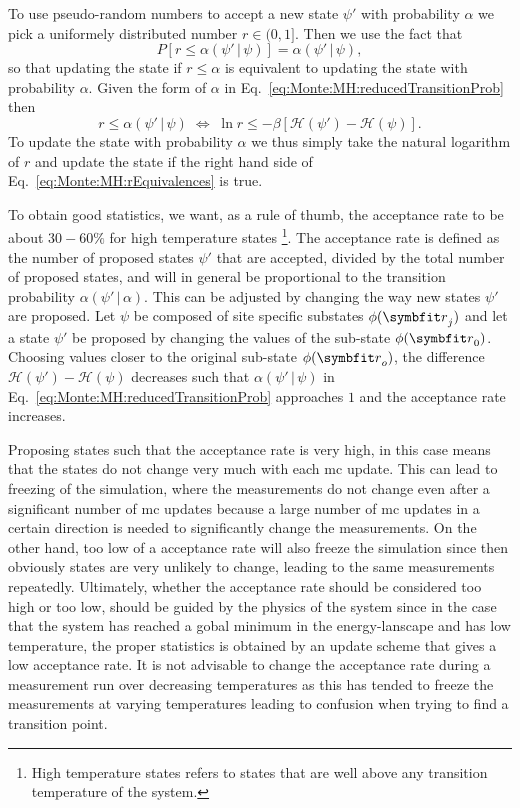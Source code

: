 To use pseudo-random numbers to accept a new state $\psi'$ with probability $\alpha$ we pick a uniformely distributed number $r\in(0,1]$. Then
we use the fact that
\begin{equation}
    \label{eq:Monte:MH:rProbability}
    P[r \leq \alpha(\psi'\,|\,\psi)] = \alpha(\psi'\,|\,\psi),
\end{equation}
so that updating the state if $r\leq\alpha$ is equivalent to updating the state with probability $\alpha$. Given the form of $\alpha$ in
Eq.~\eqref{eq:Monte:MH:reducedTransitionProb} then
\begin{equation}
    \label{eq:Monte:MH:rEquivalences}
    r \leq \alpha(\psi'\,|\,\psi)\;\Leftrightarrow\;\ln r \leq -\beta[\mathcal{H}(\psi')-\mathcal{H}(\psi)].
\end{equation}
To update the state with probability $\alpha$ we thus simply take the natural logarithm of $r$ and update the state if the right hand
side of Eq.~\eqref{eq:Monte:MH:rEquivalences} is true.

To obtain good statistics, we want, as a rule of thumb, the acceptance rate to be about $30-60\%$ for high temperature states%
\footnote{High temperature states refers to states that are well above any transition temperature of the system.}. %
The acceptance rate is defined as the
number of proposed states $\psi'$ that are accepted, divided by the total number of proposed states, and will in general be proportional
to the transition probability $\alpha(\psi'\,|\,\alpha)$. This can be adjusted by changing the way
new states $\psi'$ are proposed. Let $\psi$ be composed of site specific substates $\phi(\v{r}_j)$ and let a state $\psi'$ be proposed
by changing the values of the sub-state $\phi(\v{r}_0)$. Choosing values closer to the original sub-state $\phi(\v{r}_o)$, the difference
$\mathcal{H}(\psi')-\mathcal{H}(\psi)$ decreases such that $\alpha(\psi'\,|\,\psi)$ in
Eq.~\eqref{eq:Monte:MH:reducedTransitionProb} approaches $1$ and the acceptance rate increases.

Proposing states such that the acceptance rate is very high, in this case means that the states do not change very much with each \ac{mc} update. This
can lead to freezing of the simulation, where the measurements do not change even after a significant number of \ac{mc} updates because
a large number of \ac{mc} updates in a certain direction is needed to significantly change the measurements. On the other hand, too low
of a acceptance rate will also freeze the simulation since then obviously states are very unlikely to change, leading to the same
measurements repeatedly. Ultimately, whether the acceptance rate should be considered too high or too low, should be guided by the physics of
the system since in the case that the system has reached a gobal minimum in the energy-lanscape and has low temperature,
the proper statistics is obtained by
an update scheme that gives a low acceptance rate. It is not advisable to change the acceptance rate during a measurement run over
decreasing temperatures as this has tended to freeze the measurements at varying temperatures leading to confusion when trying to
find a transition point.

